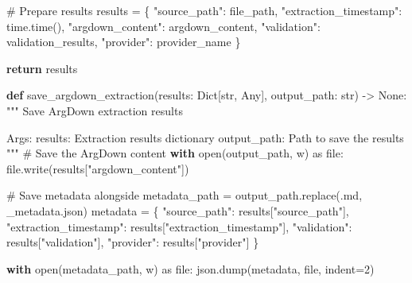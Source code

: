 \documentclass[
  11pt,
  letterpaper,
]{book}
\newenvironment{Shaded}{\begin{snugshade}}{\end{snugshade}}
\newcommand{\BuiltInTok}[1]{\textcolor[rgb]{0.00,0.23,0.31}{#1}}
\newcommand{\CommentTok}[1]{\textcolor[rgb]{0.37,0.37,0.37}{#1}}
\newcommand{\ControlFlowTok}[1]{\textcolor[rgb]{0.00,0.23,0.31}{\textbf{#1}}}
\newcommand{\DecValTok}[1]{\textcolor[rgb]{0.68,0.00,0.00}{#1}}
\newcommand{\ImportTok}[1]{\textcolor[rgb]{0.00,0.46,0.62}{#1}}
\newcommand{\KeywordTok}[1]{\textcolor[rgb]{0.00,0.23,0.31}{\textbf{#1}}}
\newcommand{\NormalTok}[1]{\textcolor[rgb]{0.00,0.23,0.31}{#1}}
\newcommand{\OperatorTok}[1]{\textcolor[rgb]{0.37,0.37,0.37}{#1}}
\newcommand{\StringTok}[1]{\textcolor[rgb]{0.13,0.47,0.30}{#1}}
\newcommand{\VariableTok}[1]{\textcolor[rgb]{0.07,0.07,0.07}{#1}}
\begin{document}
\begin{Shaded}
\begin{Highlighting}[]
    \CommentTok{\# Prepare results}
\NormalTok{    results }\OperatorTok{=}\NormalTok{ \{}
        \StringTok{"source\_path"}\NormalTok{: file\_path,}
        \StringTok{"extraction\_timestamp"}\NormalTok{: time.time(),}
        \StringTok{"argdown\_content"}\NormalTok{: argdown\_content,}
        \StringTok{"validation"}\NormalTok{: validation\_results,}
        \StringTok{"provider"}\NormalTok{: provider\_name}
\NormalTok{    \}}

    \ControlFlowTok{return}\NormalTok{ results}

\KeywordTok{def}\NormalTok{ save\_argdown\_extraction(results: Dict[}\BuiltInTok{str}\NormalTok{, Any], output\_path: }\BuiltInTok{str}\NormalTok{) }\OperatorTok{{-}\textgreater{}} \VariableTok{None}\NormalTok{:}
    \CommentTok{"""}
\CommentTok{    Save ArgDown extraction results}

\CommentTok{    Args:}
\CommentTok{        results: Extraction results dictionary}
\CommentTok{        output\_path: Path to save the results}
\CommentTok{    """}
    \CommentTok{\# Save the ArgDown content}
    \ControlFlowTok{with} \BuiltInTok{open}\NormalTok{(output\_path, }\StringTok{\textquotesingle{}w\textquotesingle{}}\NormalTok{) }\ImportTok{as} \BuiltInTok{file}\NormalTok{:}
        \BuiltInTok{file}\NormalTok{.write(results[}\StringTok{"argdown\_content"}\NormalTok{])}

    \CommentTok{\# Save metadata alongside}
\NormalTok{    metadata\_path }\OperatorTok{=}\NormalTok{ output\_path.replace(}\StringTok{\textquotesingle{}.md\textquotesingle{}}\NormalTok{, }\StringTok{\textquotesingle{}\_metadata.json\textquotesingle{}}\NormalTok{)}
\NormalTok{    metadata }\OperatorTok{=}\NormalTok{ \{}
        \StringTok{"source\_path"}\NormalTok{: results[}\StringTok{"source\_path"}\NormalTok{],}
        \StringTok{"extraction\_timestamp"}\NormalTok{: results[}\StringTok{"extraction\_timestamp"}\NormalTok{],}
        \StringTok{"validation"}\NormalTok{: results[}\StringTok{"validation"}\NormalTok{],}
        \StringTok{"provider"}\NormalTok{: results[}\StringTok{"provider"}\NormalTok{]}
\NormalTok{    \}}

    \ControlFlowTok{with} \BuiltInTok{open}\NormalTok{(metadata\_path, }\StringTok{\textquotesingle{}w\textquotesingle{}}\NormalTok{) }\ImportTok{as} \BuiltInTok{file}\NormalTok{:}
\NormalTok{        json.dump(metadata, }\BuiltInTok{file}\NormalTok{, indent}\OperatorTok{=}\DecValTok{2}\NormalTok{)}
\end{Highlighting}
\end{Shaded}
\end{document}
